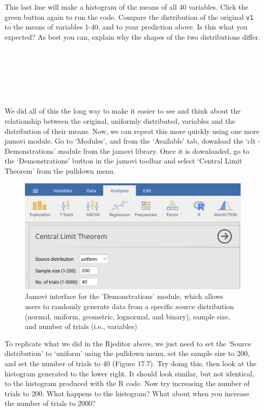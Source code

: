 \documentclass[
  openany]{scrbook}
\begin{document}
This last line will make a histogram of the means of all 40 variables.
Click the green button again to run the code.
Compare the distribution of the original \texttt{v1} to the means of variables 1-40, and to your prediction above.
Is this what you expected?
As best you can, explain why the shapes of the two distributions differ.

\begin{verbatim}






\end{verbatim}

We did all of this the long way to make it easier to see and think about the relationship between the original, uniformly distributed, variables and the distribution of their means.
Now, we can repeat this more quickly using one more jamovi module.
Go to `Modules', and from the `Available' tab, download the `clt - Demonstrations' module from the jamovi library.
Once it is downloaded, go to the `Demonstrations' button in the jamovi toolbar and select `Central Limit Theorem' from the pulldown menu.

\begin{figure}
\includegraphics[width=0.8\linewidth]{img/jamovi_clt} \caption{Jamovi interface for the 'Demonstrations' module, which allows users to randomly generate data from a specific source distribution (normal, uniform, geometric, lognormal, and binary), sample size, and number of trials (i.e., variables)}\label{fig:unnamed-chunk-74}
\end{figure}

To replicate what we did in the Rjeditor above, we just need to set the `Source distribution' to `uniform' using the pulldown menu, set the sample size to 200, and set the number of trials to 40 (Figure 17.7).
Try doing this, then look at the histogram generated to the lower right.
It should look similar, but not identical, to the histogram produced with the R code.
Now try increasing the number of trials to 200.
What happens to the histogram?
What about when you increase the number of trials to 2000?
\end{document}
